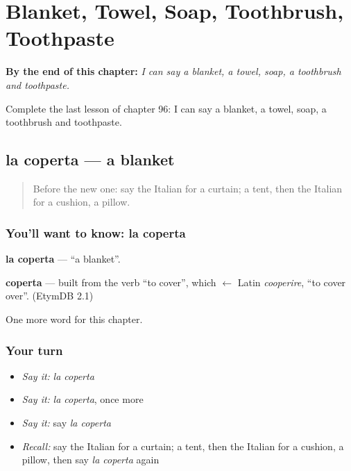 
\chapter{Blanket, Towel, Soap, Toothbrush, Toothpaste}
\label{ch:it-blanket-towel-soap-toothbrush-toothpaste}

\begin{chapteropening}
\textbf{By the end of this chapter:} \emph{I can say a blanket, a towel, soap, a toothbrush and toothpaste.}

Complete the last lesson of chapter 96: I can say a blanket, a towel, soap, a toothbrush and toothpaste.
\end{chapteropening}

\section[la coperta]{la coperta — a blanket}

\label{lesson:IT-C96-coperta}



\begin{quote}
Before the new one: say the Italian for a curtain; a tent, then the Italian for a cushion, a pillow.
\end{quote}

\subsection*{You'll want to know: la coperta}
\textbf{la coperta} — \textquotedblleft{}a blanket\textquotedblright{}.

\begin{cousinweb}
\textbf{coperta} — built from the verb \textquotedblleft{}to cover\textquotedblright{}, which $\leftarrow$ Latin \emph{cooperire}, \textquotedblleft{}to cover over\textquotedblright{}. (EtymDB 2.1)
\end{cousinweb}

\begin{grammarlens}[title={What you've built}]
One more word for this chapter.
\end{grammarlens}

\subsection*{Your turn}
\begin{itemize}
\raggedright
  \item \emph{Say it:} \emph{la coperta}
  \item \emph{Say it:} \emph{la coperta}, once more
  \item \emph{Say it:} say \emph{la coperta}
  \item \emph{Recall:} say the Italian for a curtain; a tent, then the Italian for a cushion, a pillow, then say \emph{la coperta} again
\end{itemize}

